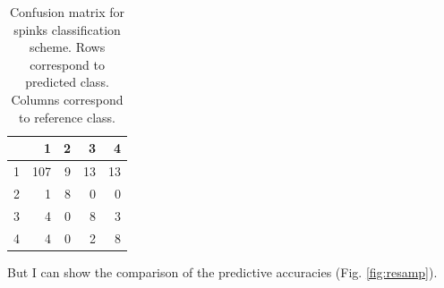\documentclass{article}\usepackage{graphicx, color}
\begin{document}
\begin{table}[ht]
\begin{center}
\begin{tabular}{rrrrr}
  \hline
 & 1 & 2 & 3 & 4 \\ 
  \hline
1 & 107 &   9 &  13 &  13 \\ 
  2 &   1 &   8 &   0 &   0 \\ 
  3 &   4 &   0 &   8 &   3 \\ 
  4 &   4 &   0 &   2 &   8 \\ 
   \hline
\end{tabular}
\caption{Confusion matrix for spinks classification scheme. Rows correspond to predicted class. Columns correspond to reference class.}
\label{tab:multi-conf-spinks}
\end{center}
\end{table}



But I can show the comparison of the predictive accuracies (Fig. \ref{fig:resamp}).
\end{document}
